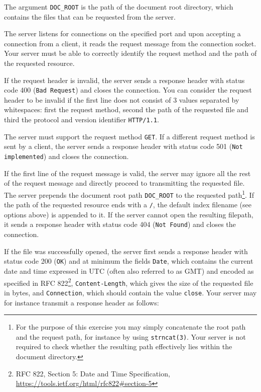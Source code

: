 The argument \verb|DOC_ROOT| is the path of the document root directory,
which contains the files that can be requested from the server.

The server listens for connections on the specified port
and upon accepting a connection from a client,
it reads the request message from the connection socket.
Your server must be able to correctly identify the request method
and the path of the requested resource.

If the request header is invalid,
the server sends a response header with status code 400 (\verb|Bad Request|)
and closes the connection.
You can consider the request header to be invalid
if the first line does not consist of 3 values separated by whitespaces:
first the request method, second the path of the requested file
and third the protocol and version identifier \verb|HTTP/1.1|.

The server must support the request method \texttt{GET}.
If a different request method is sent by a client,
the server sends a response header with status code 501 (\verb|Not implemented|)
and closes the connection.

If the first line of the request message is valid,
the server may ignore all the rest of the request message
and directly proceed to transmitting the requested file.
The server prepends the document root path \verb|DOC_ROOT|
to the requested path\footnote{
For the purpose of this exercise you may simply concatenate the
root path and the request path, for instance by using \texttt{strncat(3)}.
Your server is not required to check whether the resulting path
effectively lies within the document directory.
}.
If the path of the requested resource ends with a \verb|/|,
the default index filename (see options above) is appended to it.
If the server cannot open the resulting filepath,
it sends a response header with status code 404 (\verb|Not Found|)
and closes the connection.

If the file was successfully opened,
the server first sends a response header with status code 200 (\verb|OK|)
and at minimum the fields
\verb|Date|, which contains the current date and time
expressed in UTC (often also referred to as GMT)
and encoded as specified in RFC 822\footnote{RFC 822,
Section 5: Date and Time Specification,
\url{https://tools.ietf.org/html/rfc822\#section-5}},
\verb|Content-Length|, which gives the size of the requested file in bytes,
and \verb|Connection|, which should contain the value \verb|close|.
Your server may for instance transmit a response header as follows:

